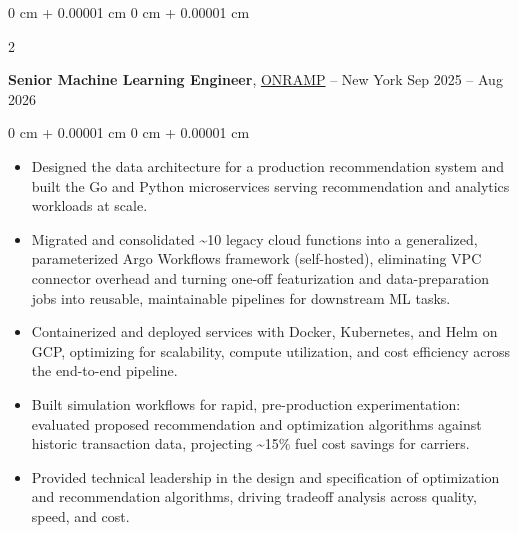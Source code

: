 \documentclass[10pt, letterpaper]{article}
\newenvironment{highlights}{
    \begin{itemize}[
        topsep=0.04 cm,
        parsep=0.04 cm,
        partopsep=0pt,
        itemsep=0pt,
        leftmargin=0 cm + 10pt
    ]
}{
    \end{itemize}
} %
\newenvironment{onecolentry}{
    \begin{adjustwidth}{
        0 cm + 0.00001 cm
    }{
        0 cm + 0.00001 cm
    }
}{
    \end{adjustwidth}
} %
\newenvironment{twocolentry}[2][]{
    \onecolentry
    \def\secondColumn{#2}
    \setcolumnwidth{\fill, 4.5 cm}
    \begin{paracol}{2}
}{
    \switchcolumn \raggedleft \secondColumn
    \end{paracol}
    \endonecolentry
} %
\begin{document}
    \begin{twocolentry}{
            Sep 2025 – Aug 2026
        }
            \textbf{Senior Machine Learning Engineer}, \href{https://onrampfleet.com/}{ONRAMP} -- New York\end{twocolentry}
        \vspace{0.06 cm}
        \begin{onecolentry}
            \begin{highlights}
                \item Designed the data architecture for a production recommendation system and built the Go and Python microservices serving recommendation and analytics workloads at scale.
                \item Migrated and consolidated \textasciitilde10 legacy cloud functions into a generalized, parameterized Argo Workflows framework (self-hosted), eliminating VPC connector overhead and turning one-off featurization and data-preparation jobs into reusable, maintainable pipelines for downstream ML tasks.
                \item Containerized and deployed services with Docker, Kubernetes, and Helm on GCP, optimizing for scalability, compute utilization, and cost efficiency across the end-to-end pipeline.
                \item Built simulation workflows for rapid, pre-production experimentation: evaluated proposed recommendation and optimization algorithms against historic transaction data, projecting \textasciitilde15\% fuel cost savings for carriers.
                \item Provided technical leadership in the design and specification of optimization and recommendation algorithms, driving tradeoff analysis across quality, speed, and cost.
            \end{highlights}
        \end{onecolentry}
\end{document}

